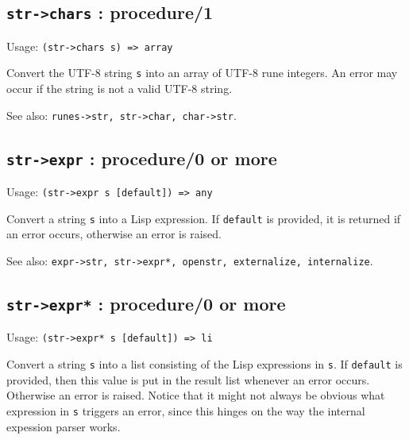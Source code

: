 \documentclass[
]{article}
\newcommand{\passthrough}[1]{#1}
\begin{document}
\hypertarget{str-chars-procedure1-1}{%
\subsection{\texorpdfstring{\texttt{str-\textgreater{}chars} :
procedure/1}{str-\textgreater chars : procedure/1}}\label{str-chars-procedure1-1}}

Usage: \passthrough{\lstinline!(str->chars s) => array!}

Convert the UTF-8 string \passthrough{\lstinline!s!} into an array of
UTF-8 rune integers. An error may occur if the string is not a valid
UTF-8 string.

See also: \passthrough{\lstinline!runes->str, str->char, char->str!}.

\hypertarget{str-expr-procedure0-or-more-2}{%
\subsection{\texorpdfstring{\texttt{str-\textgreater{}expr} :
procedure/0 or
more}{str-\textgreater expr : procedure/0 or more}}\label{str-expr-procedure0-or-more-2}}

Usage: \passthrough{\lstinline!(str->expr s [default]) => any!}

Convert a string \passthrough{\lstinline!s!} into a Lisp expression. If
\passthrough{\lstinline!default!} is provided, it is returned if an
error occurs, otherwise an error is raised.

See also:
\passthrough{\lstinline!expr->str, str->expr*, openstr, externalize, internalize!}.

\hypertarget{str-expr-procedure0-or-more-3}{%
\subsection{\texorpdfstring{\texttt{str-\textgreater{}expr*} :
procedure/0 or
more}{str-\textgreater expr* : procedure/0 or more}}\label{str-expr-procedure0-or-more-3}}

Usage: \passthrough{\lstinline!(str->expr* s [default]) => li!}

Convert a string \passthrough{\lstinline!s!} into a list consisting of
the Lisp expressions in \passthrough{\lstinline!s!}. If
\passthrough{\lstinline!default!} is provided, then this value is put in
the result list whenever an error occurs. Otherwise an error is raised.
Notice that it might not always be obvious what expression in
\passthrough{\lstinline!s!} triggers an error, since this hinges on the
way the internal expession parser works.
\end{document}
